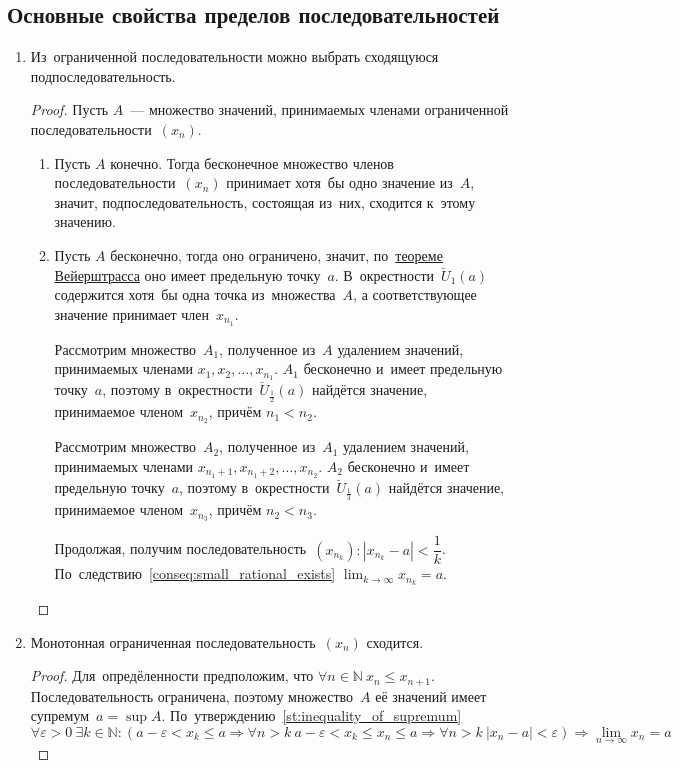 \subsection{Основные свойства пределов последовательностей}
\begin{enumerate}
	\item Из~ограниченной последовательности можно выбрать сходящуюся подпоследовательность.
	\begin{proof}
	Пусть $A$~--- множество значений, принимаемых членами ограниченной последовательности~$(x_n)$.
	\begin{enumerate}
		\item Пусть $A$ конечно.
		Тогда бесконечное множество членов последовательности~$(x_n)$ принимает хотя~бы одно значение из~$A$, значит, подпоследовательность, состоящая из~них, сходится к~этому значению.
		
		\item Пусть $A$ бесконечно, тогда оно ограничено, значит, по~\hyperref[th:Weierstrass]{теореме Вейерштрасса} оно имеет предельную точку~$a$.
		В~окрестности~$\breve U_1(a)$ содержится хотя~бы одна точка из~множества~$A$, а соответствующее значение принимает член~$x_{n_1}$.
		
		Рассмотрим множество~$A_1$, полученное из~$A$ удалением значений, принимаемых членами $x_1, x_2, \ldots, x_{n_1}$.
		$A_1$ бесконечно и~имеет предельную точку~$a$, поэтому в~окрестности~$\breve U_\frac12(a)$ найдётся значение, принимаемое членом~$x_{n_2}$, причём $n_1 < n_2$.
		
		Рассмотрим множество~$A_2$, полученное из~$A_1$ удалением значений, принимаемых членами $x_{n_1 + 1}, x_{n_1 + 2}, \ldots, x_{n_2}$.
		$A_2$ бесконечно и~имеет предельную точку~$a$, поэтому в~окрестности~$\breve U_\frac13(a)$ найдётся значение, принимаемое членом~$x_{n_3}$, причём $n_2 < n_3$.
		
		Продолжая, получим последовательность~$(x_{n_k}) \colon |x_{n_k} - a| < \dfrac1k$. По~следствию~\ref{conseq:small_rational_exists} $\displaystyle \lim_{k \to \infty} x_{n_k} = a$.
	\end{enumerate}
	\end{proof}
	
	\item Монотонная ограниченная последовательность~$(x_n)$ сходится.
	\begin{proof}
	Для~опредёленности предположим, что $\forall n \in \mathbb N \ x_n \leqslant x_{n+1}$.
	Последовательность ограничена, поэтому множество~$A$ её значений имеет супремум~$a = \sup A$.
	По~утверждению~\ref{st:inequality_of_supremum}
	\begin{equation*}
	\forall \varepsilon > 0 \ \exists k \in \mathbb N \colon (a - \varepsilon < x_k \leqslant a \Rightarrow \forall n > k \ a - \varepsilon < x_k \leqslant x_n \leqslant a \Rightarrow \forall n > k \ |x_n - a| < \varepsilon) \Rightarrow \lim_{n \to \infty} x_n = a
	\end{equation*}
	\end{proof}
	

\end{enumerate}
